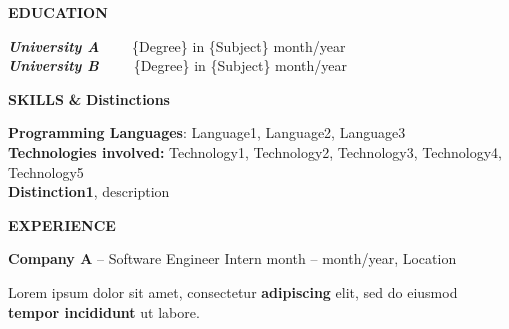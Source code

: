 \documentclass[11pt]{resume} %
\begin{document}

\begin{flushleft}
    {\Large \textbf{{EDUCATION}}}
\end{flushleft}
\smallskip
\hline

\textbf{{\em University A}} \ \ \ \ \{Degree\} in \{Subject\} \hfill month/year \\
\textbf{{\em University B}}\ \ \ \ \ \{Degree\} in \{Subject\} \hfill month/year \\[-25]

\bigskip
\begin{flushleft}
    {\Large \textbf{{SKILLS}}} {\Medium \textbf{{\&}}} {\Large \textbf{{Distinctions}}}
\end{flushleft}
\smallskip
\hline

{\bf Programming Languages}: Language1, Language2, Language3\\
{\bf Technologies involved:} Technology1, Technology2, Technology3, Technology4, Technology5\\
{\bf Distinction1}, description\\[-25]

\bigskip
\begin{flushleft}
    
    {\Large \textbf{{EXPERIENCE}}}
\end{flushleft}
\smallskip
\hline

{\bf \Large{Company A}} -- Software Engineer Intern \hfill month -- month/year, Location \\[-25]
\begin{list}{\textbullet}{\leftmargin=0.6em \itemindent=0.45em}
    \item Lorem ipsum dolor sit amet, consectetur \textbf{adipiscing} elit, sed do eiusmod \textbf{tempor incididunt} ut labore.
\end{list}
\end{document}

